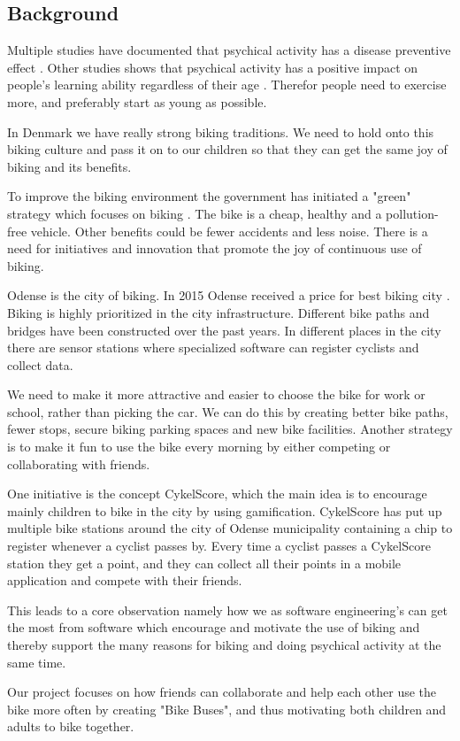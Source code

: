 \subsection{Background}


Multiple studies have documented that psychical activity has a disease preventive effect \cite{jensen2007cykling}. Other studies shows that psychical activity has a positive impact on people's learning ability regardless of their age \cite{fysiskAktivitet}. Therefor people need to exercise more, and preferably start as young as possible.

In Denmark we have really strong biking traditions. We need to hold onto this biking culture and pass it on to our children so that they can get the same joy of biking and its benefits. 

To improve the biking environment the government has initiated a "green" strategy which focuses on biking \cite{DanmarkOpPaaCyklen}. The bike is a cheap, healthy and a pollution-free vehicle. Other benefits could be fewer accidents and less noise. There is a need for initiatives and innovation that promote the joy of continuous use of biking.

Odense is the city of biking. In 2015 Odense received a price for best biking city \cite{OdenseCycleCity2015}. Biking is highly prioritized in the city infrastructure. Different bike paths and bridges have been constructed over the past years. In different places in the city there are sensor stations where specialized software can register cyclists and collect data. 

We need to make it more attractive and easier to choose the bike for work or school, rather than picking the car. We can do this by creating better bike paths, fewer stops, secure biking parking spaces and new bike facilities. Another strategy is to make it fun to use the bike every morning by either competing or collaborating with friends.

One initiative is the concept CykelScore, which the main idea is to encourage mainly children to bike in the city by using gamification. CykelScore has put up multiple bike stations around the city of Odense municipality containing a chip to register whenever a cyclist passes by. Every time a cyclist passes a CykelScore station they get a point, and they can collect all their points in a mobile application and compete with their friends.

This leads to a core observation namely how we as software engineering's can get the most from software which encourage and motivate the use of biking and thereby support the many reasons for biking and doing psychical activity at the same time. 

Our project focuses on how friends can collaborate and help each other use the bike more often by creating "Bike Buses", and thus motivating both children and adults to bike together.